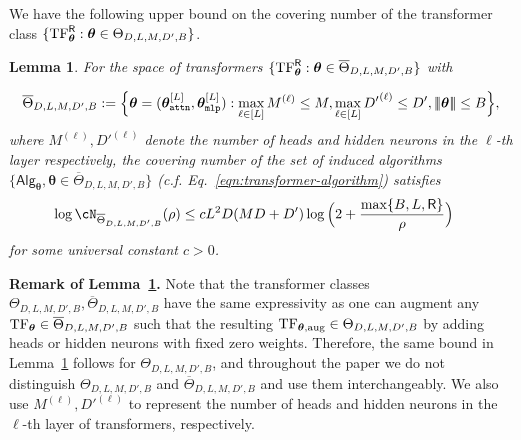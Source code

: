 \documentclass[10pt]{article}
\newtheorem{lemma}[theorem]{Lemma}
\renewcommand{\bar}{\overline}
\newcommand{\<}{\left\langle}
\renewcommand{\>}{\right\rangle}
\newcommand{\lth}{{(\ell)}}
\newcommand{\TF}{{\rm TF}}
\newcommand{\nrmp}[1]{{\left|\!\left|\!\left|{#1}\right|\!\right|\!\right|}}
\newcommand{\mlp}{{\tt mlp}}
\newcommand{\attn}{{\tt attn}}
\newcommand{\sAlg}{{\mathsf{Alg}}}
\newcommand{\tfpar}{{\btheta}}
\newcommand{\tfparspace}{{\Theta}}
\newcommand{\layer}{{L}}
\newcommand{\hidden}{{D'}}
\newcommand{\head}{{M}}
\newcommand{\normb}{{B}}
\newcommand{\clipval}{{\mathsf{R}}}
\newcommand{\embd}{{D}}
\def\btheta{{\boldsymbol \theta}}
\begin{document}
We have the following upper bound on the covering number of the transformer class $\{\TF^\clipval_{\tfpar}:\tfpar\in\tfparspace_{D, \layer,\head,\hidden,\normb}\}$.
\begin{lemma}\label{lm:cover_num_bound}
For the space of transformers $\{\TF^\clipval_{\tfpar}:\tfpar\in\bar{\tfparspace}_{D, \layer,\head,\hidden,\normb}\}$ with

\begin{align*}
\bar{\tfparspace}_{D, \layer,\head,\hidden,\normb}:= \Big\{\tfpar=(\tfpar^{[\layer]}_\attn,\tfpar^{[\layer]}_\mlp):\max_{\ell\in[\layer]}\head^\lth\leq \head, \max_{\ell\in[\layer]}\hidden^\lth\leq \hidden, \nrmp{\tfpar}\leq\normb \Big\},
\end{align*}where $\head^\lth,\hidden^\lth$ denote the number  of heads and hidden neurons in the $\ell$-th layer respectively, the covering number of the set of induced algorithms $\{\sAlg_\tfpar,\tfpar\in\bar{\tfparspace}_{D, \layer,\head,\hidden,\normb}\}$ (c.f. Eq.~\ref{eqn:transformer-algorithm}) satisfies
\begin{align*}
    \log \cN_{\bar{\tfparspace}_{D, \layer,\head,\hidden,\normb}}(\rho)
    &\leq c\layer^2\embd(\head\embd+\hidden)\log\Big(2+\frac{\max\{\normb,\layer,\clipval\}}{\rho}\Big)
\end{align*} for some universal constant $c>0$.







\end{lemma}
\textbf{Remark of Lemma~\ref{lm:cover_num_bound}.} Note that the transformer classes ${\tfparspace}_{D, \layer,\head,\hidden,\normb},\bar{\tfparspace}_{D, \layer,\head,\hidden,\normb}$ have the same expressivity as one can augment any $\TF_\tfpar\in \bar{\tfparspace}_{D, \layer,\head,\hidden,\normb}$ such that the resulting $\TF_{\tfpar,\mathrm{aug}}\in{\tfparspace}_{D, \layer,\head,\hidden,\normb}$ by adding heads or hidden neurons with fixed zero weights. Therefore, the same bound in Lemma~\ref{lm:cover_num_bound} follows for ${\tfparspace}_{D, \layer,\head,\hidden,\normb}$, and  throughout the paper we do not distinguish ${\tfparspace}_{D, \layer,\head,\hidden,\normb}$ and $\bar{\tfparspace}_{D, \layer,\head,\hidden,\normb}$ and use them interchangeably. We also use $\head^\lth,\hidden^\lth$ to  represent the number  of heads and hidden neurons in the $\ell$-th layer of transformers, respectively.
\end{document}
